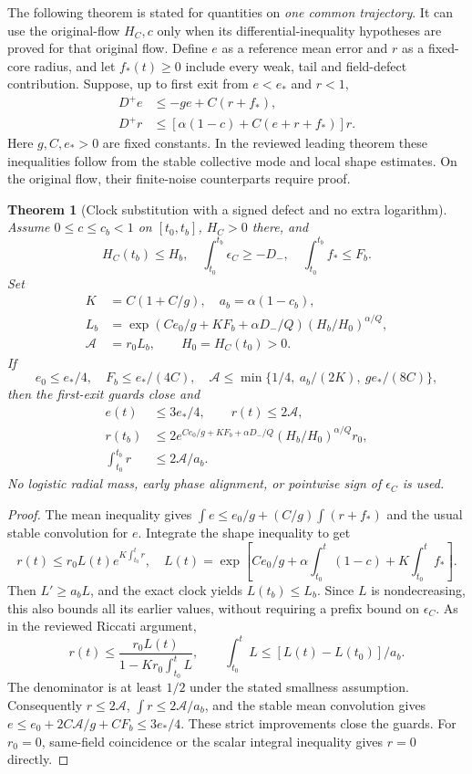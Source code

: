 \documentclass[11pt]{article}
\numberwithin{equation}{section}
\newtheorem{theorem}{Theorem}[section]\newtheorem{lemma}[theorem]{Lemma}\newtheorem{proposition}[theorem]{Proposition}\newtheorem{corollary}[theorem]{Corollary}
\theoremstyle{remark}\newtheorem{remark}[theorem]{Remark}
\begin{document}
The following theorem is stated for quantities on \emph{one common trajectory}. It can use the original-flow $H_C,c$ only when its differential-inequality hypotheses are proved for that original flow. Define $e$ as a reference mean error and $r$ as a fixed-core radius, and let $f_*(t)\ge0$ include every weak, tail and field-defect contribution.
Suppose, up to first exit from $e<e_*$ and $r<1$,
\begin{align}
 D^+e&\le-ge+C(r+f_*),\label{inc:AN03:clock:v1:meanineq}\\
 D^+r&\le[\alpha(1-c)+C(e+r+f_*)]r.\label{inc:AN03:clock:v1:shapeineq}
\end{align}
Here $g,C,e_*>0$ are fixed constants. In the reviewed leading theorem these inequalities follow from the stable collective mode and local shape estimates. On the original flow, their finite-noise counterparts require proof.

\begin{theorem}[Clock substitution with a signed defect and no extra logarithm]\label{inc:AN03:clock:v1:passage}
Assume $0\le c\le c_b<1$ on $[t_0,t_b]$, $H_C>0$ there, and
\[
 H_C(t_b)\le H_b,\quad \int_{t_0}^{t_b}\epsilon_C\ge-D_-,\quad
 \int_{t_0}^{t_b}f_*\le F_b.
\]
Set
\begin{align*}
 K&=C(1+C/g),\quad a_b=\alpha(1-c_b),\\
 L_b&=\exp(Ce_0/g+KF_b+\alpha D_-/Q)(H_b/H_0)^{\alpha/Q},\\
 \mathcal A&=r_0 L_b,\qquad H_0=H_C(t_0)>0.
\end{align*}
If
\[
 e_0\le e_*/4,\quad F_b\le e_*/(4C),\quad
 \mathcal A\le\min\{1/4,\ a_b/(2K),\ ge_*/(8C)\},
\]
then the first-exit guards close and
\begin{align}
 e(t)&\le3e_*/4,\qquad r(t)\le2\mathcal A,\nonumber\\
 r(t_b)&\le2e^{Ce_0/g+KF_b+\alpha D_-/Q}(H_b/H_0)^{\alpha/Q}r_0,\label{inc:AN03:clock:v1:result}\\
 \int_{t_0}^{t_b}r&\le2\mathcal A/a_b.\nonumber
\end{align}
No logistic radial mass, early phase alignment, or pointwise sign of $\epsilon_C$ is used.
\end{theorem}
\begin{proof}
The mean inequality gives
$\int e\le e_0/g+(C/g)\int(r+f_*)$ and the usual stable convolution for $e$.
Integrate the shape inequality to get
\[
 r(t)\le r_0L(t)e^{K\int_{t_0}^tr},\quad
 L(t)=\exp\left[Ce_0/g+\alpha\int_{t_0}^t(1-c)+K\int_{t_0}^tf_*\right].
\]
Then $L'\ge a_bL$, and the exact clock yields $L(t_b)\le L_b$. Since $L$ is nondecreasing, this also bounds all its earlier values, without requiring a prefix bound on $\epsilon_C$.
As in the reviewed Riccati argument,
\[
 r(t)\le\frac{r_0L(t)}{1-Kr_0\int_{t_0}^tL},\qquad
 \int_{t_0}^{t}L\le[L(t)-L(t_0)]/a_b.
\]
The denominator is at least $1/2$ under the stated smallness assumption. Consequently $r\le2\mathcal A$, $\int r\le2\mathcal A/a_b$, and the stable mean convolution gives
$e\le e_0+2C\mathcal A/g+CF_b\le3e_*/4$. These strict improvements close the guards. For $r_0=0$, same-field coincidence or the scalar integral inequality gives $r=0$ directly.
\end{proof}
\end{document}
